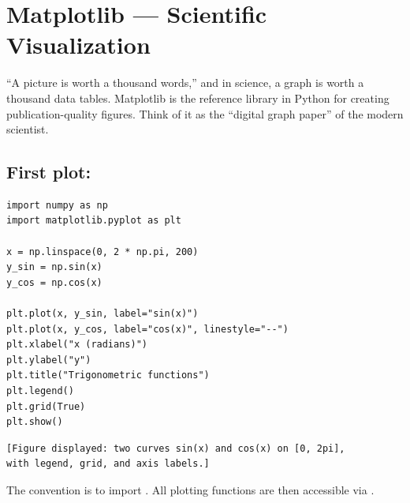 \chapter{Matplotlib --- Scientific Visualization}
\label{ch:matplotlib}

\begin{intuition}
``A picture is worth a thousand words,'' and in science, a graph is worth a thousand
data tables. Matplotlib is the reference library in Python
for creating publication-quality figures. Think of it as the
``digital graph paper'' of the modern scientist.
\end{intuition}

\section{First plot: }

\begin{codeblock}[title=\textbf{Python}]
\begin{verbatim}
import numpy as np
import matplotlib.pyplot as plt

x = np.linspace(0, 2 * np.pi, 200)
y_sin = np.sin(x)
y_cos = np.cos(x)

plt.plot(x, y_sin, label="sin(x)")
plt.plot(x, y_cos, label="cos(x)", linestyle="--")
plt.xlabel("x (radians)")
plt.ylabel("y")
plt.title("Trigonometric functions")
plt.legend()
plt.grid(True)
plt.show()
\end{verbatim}
\end{codeblock}

\begin{codeoutput}
\begin{verbatim}
[Figure displayed: two curves sin(x) and cos(x) on [0, 2pi],
with legend, grid, and axis labels.]
\end{verbatim}
\end{codeoutput}

\begin{remark}
The convention is to import . All plotting
functions are then accessible via .
\end{remark}

